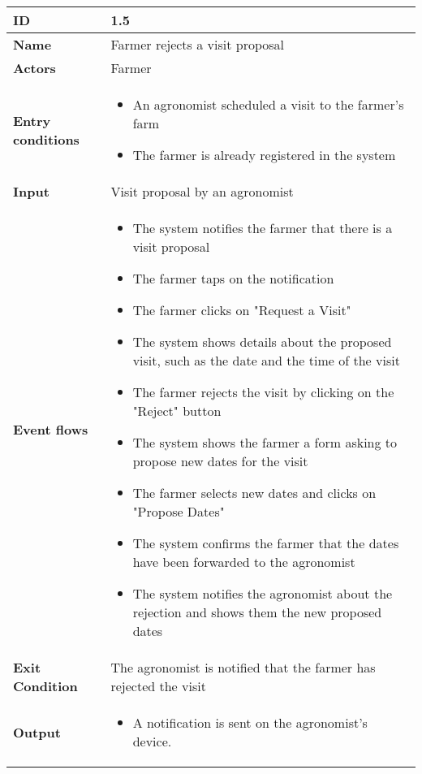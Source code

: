 \begin{longtable}[H]{ | l | p{10cm} | }
\hline
{\cellcolor[rgb]{0.753,0.753,0.753}}\textbf{ID}  & 1.5 \\ \hline
{\cellcolor[rgb]{0.753,0.753,0.753}}\textbf{Name} & Farmer rejects a visit proposal \\ \hline
{\cellcolor[rgb]{0.753,0.753,0.753}}\textbf{Actors} & Farmer \\ \hline
{\cellcolor[rgb]{0.753,0.753,0.753}}\textbf{Entry conditions} &
\begin{itemize}
    \item An agronomist scheduled a visit to the farmer's farm
    \item The farmer is already registered in the system
\end{itemize}
\\ \hline
{\cellcolor[rgb]{0.753,0.753,0.753}}\textbf{Input} & Visit proposal by an agronomist\\ \hline
{\cellcolor[rgb]{0.753,0.753,0.753}}\textbf{Event flows} &
\begin{itemize}
    \item The system notifies the farmer that there is a visit proposal
    \item The farmer taps on the notification
    \item The farmer clicks on "Request a Visit"
    \item The system shows details about the proposed visit, such as the date and the time of the visit
    \item The farmer rejects the visit by clicking on the "Reject" button
    \item The system shows the farmer a form asking to propose new dates for the visit
    \item The farmer selects new dates and clicks on "Propose Dates"
    \item The system confirms the farmer that the dates have been forwarded to the agronomist
    \item The system notifies the agronomist about the rejection and shows them the new proposed dates
\end{itemize}
\\ \hline
{\cellcolor[rgb]{0.753,0.753,0.753}}\textbf{Exit Condition} & The agronomist is notified that the farmer has rejected the visit\\ \hline
{\cellcolor[rgb]{0.753,0.753,0.753}}\textbf{Output} & 
\begin{itemize}
    \item A notification is sent on the agronomist's device.

\end{itemize}
\end{longtable}

